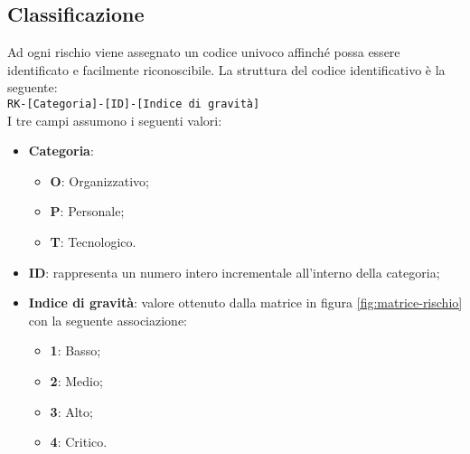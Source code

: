 \documentclass[../piano-di-progetto.tex]{subfiles}
\begin{document}
\subsection{Classificazione}
Ad ogni rischio viene assegnato un codice univoco affinché possa essere identificato e facilmente riconoscibile. La struttura del codice identificativo è la seguente: \\
\texttt{RK-[Categoria]-[ID]-[Indice di gravità]} \\
I tre campi assumono i seguenti valori:
\begin{itemize}
    \item \textbf{Categoria}:
        \begin{itemize}
            \item \textbf{O}: Organizzativo;
            \item \textbf{P}: Personale;
            \item \textbf{T}: Tecnologico.
        \end{itemize}
    \item \textbf{ID}: rappresenta un numero intero incrementale all'interno della categoria;
    \item \textbf{Indice di gravità}: valore ottenuto dalla matrice in figura \ref{fig:matrice-rischio} con la seguente associazione:
        \begin{itemize}
            \item \textbf{1}: Basso;
            \item \textbf{2}: Medio;
            \item \textbf{3}: Alto;
            \item \textbf{4}: Critico.
        \end{itemize}
\end{itemize}
\end{document}

